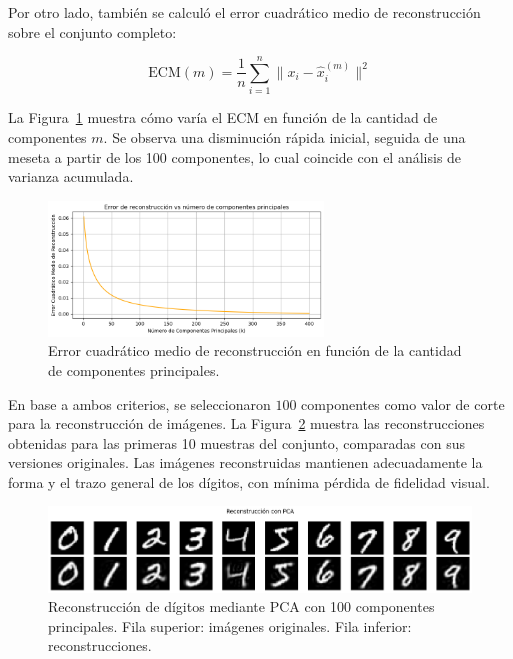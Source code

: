 \documentclass[11pt]{article}
\begin{document}
Por otro lado, también se calculó el error cuadrático medio de reconstrucción sobre el conjunto completo:

\[
\text{ECM}(m) = \frac{1}{n} \sum_{i=1}^{n} \|x_i - \hat{x}_i^{(m)}\|^2
\]

La Figura~\ref{fig:pca_reconstruction_error} muestra cómo varía el ECM en función de la cantidad de componentes $m$. Se observa una disminución rápida inicial, seguida de una meseta a partir de los 100 componentes, lo cual coincide con el análisis de varianza acumulada.

\begin{figure}[H]
    \centering
    \includegraphics[width=0.65\textwidth]{figures/pca_reconstruction_error.png}
    \caption{Error cuadrático medio de reconstrucción en función de la cantidad de componentes principales.}
    \label{fig:pca_reconstruction_error}
\end{figure}

En base a ambos criterios, se seleccionaron $100$ componentes como valor de corte para la reconstrucción de imágenes. La Figura~\ref{fig:pca_reconstructed_images_100} muestra las reconstrucciones obtenidas para las primeras 10 muestras del conjunto, comparadas con sus versiones originales. Las imágenes reconstruidas mantienen adecuadamente la forma y el trazo general de los dígitos, con mínima pérdida de fidelidad visual.

\begin{figure}[H]
    \centering
    \includegraphics[width=\textwidth]{figures/pca_reconstructions_100.png}
    \caption{Reconstrucción de dígitos mediante PCA con 100 componentes principales. Fila superior: imágenes originales. Fila inferior: reconstrucciones.}
    \label{fig:pca_reconstructed_images_100}
\end{figure}
\end{document}
